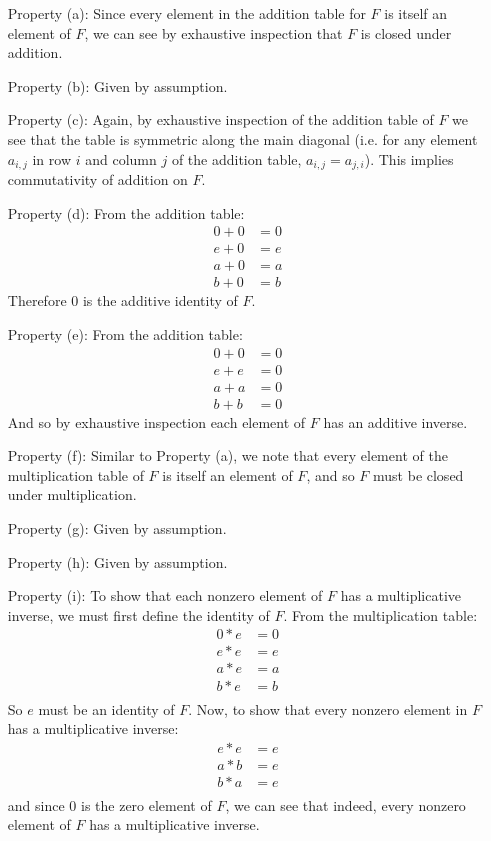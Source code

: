 \documentclass{article}
\begin{document}
\begin{enumerate}
			\begin{enumerate}
				\item [Property (a):] Since every element in the addition table for $F$ is itself an 
					element of $F$, we can see by exhaustive inspection that $F$ is closed under
					addition.
				\item [Property (b):] Given by assumption.
				\item [Property (c):] Again, by exhaustive inspection of the addition table of $F$ we 
					see that the table is symmetric along the main diagonal (i.e. for any element
					$a_{i,j}$ in row $i$ and column $j$ of the addition table, $a_{i,j} = a_{j,i}$).
					This implies commutativity of addition on $F$.
				\item [Property (d):] From the addition table:
					\begin{align*}
						0 + 0 & = 0 \\
						e + 0 & = e \\
						a + 0 & = a \\
						b + 0 & = b
					\end{align*}
					Therefore 0 is the additive identity of $F$.
				\item [Property (e):] From the addition table:
					\begin{align*}
						0 + 0 & = 0 \\
						e + e & = 0 \\
						a + a & = 0 \\
						b + b & = 0
					\end{align*}
					And so by exhaustive inspection each element of $F$ has an additive inverse.
				\item [Property (f):] Similar to Property (a), we note that every element of the
					multiplication table of $F$ is itself an element of $F$, and so $F$ must be 
					closed under multiplication.
				\item [Property (g):] Given by assumption.
				\item [Property (h):] Given by assumption.
				\item [Property (i):] To show that each nonzero element of $F$ has a multiplicative 
					inverse, we must first define the identity of $F$. From the multiplication 
					table:
					\begin{align*}
						0 * e & = 0 \\
						e * e & = e \\
						a * e & = a \\
						b * e & = b \\
					\end{align*}
					So $e$ must be an identity of $F$. Now, to show that every nonzero element in 
					$F$ has a multiplicative inverse:
					\begin{align*}
						e * e & = e \\
						a * b & = e \\
						b * a & = e \\
					\end{align*}
					and since $0$ is the zero element of $F$, we can see that indeed, every nonzero
					element of $F$ has a multiplicative inverse.
			\end{enumerate}


\end{enumerate}
\end{document}
